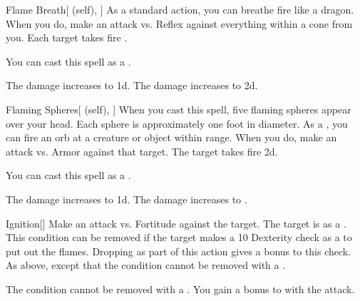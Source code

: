 \lowercase{\hypertarget{spell:Flame Breath}{}}\label{spell:Flame Breath}
\begin{attuneability}[Rank 4]{\hypertarget{spell:Flame Breath}{Flame Breath}}[ (self), ]
As a standard action, you can breathe fire like a dragon.
When you do, make an attack vs. Reflex against everything within a \arealarge cone from you.
\hit Each target takes fire .

You can cast this spell as a .

\rankline
{} The damage increases to  \plus1d.
 The damage increases to  \plus2d.
\end{attuneability}
\vspace{0.25em}



\lowercase{\hypertarget{spell:Flaming Spheres}{}}\label{spell:Flaming Spheres}
\begin{attuneability}[Rank 4]{\hypertarget{spell:Flaming Spheres}{Flaming Spheres}}[ (self), ]
When you cast this spell, five flaming spheres appear over your head.
Each sphere is approximately one foot in diameter.
As a , you can fire an orb at a creature or object within \rngclose range.
When you do, make an attack vs. Armor against that target.
\hit The target takes fire  \minus2d.

You can cast this spell as a .

\rankline
{} The damage increases to  \minus1d.
 The damage increases to .
\end{attuneability}
\vspace{0.25em}



\lowercase{\hypertarget{spell:Ignition}{}}\label{spell:Ignition}
\begin{freeability}[Rank 4]{\hypertarget{spell:Ignition}{Ignition}}[]
Make an attack vs. Fortitude against the target.
\hit The target is  as a .
This condition can be removed if the target makes a  10 Dexterity check as a  to put out the flames.
Dropping  as part of this action gives a  bonus to this check.
\crit As above, except that the condition cannot be removed with a .

\rankline
{} The condition cannot be removed with a .
 You gain a  bonus to  with the attack.
\end{freeability}
\vspace{0.25em}



